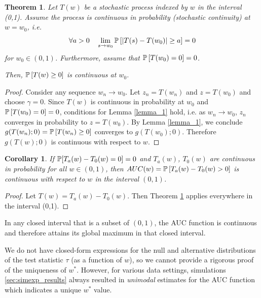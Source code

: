 \documentclass[12pt,oneside,final]{thesis}\usepackage[]{graphicx}\usepackage[]{color}
\newtheorem{thm}{Theorem}
\newtheorem{cor}{Corollary}
\begin{document}
\begin{thm} \label{main_thm}
Let $T(w)$ be  a stochastic process indexed by $w$ in the interval (0,1). Assume  the process is continuous in probability  (stochastic continuity)   at $w=w_0$,  i.e.
\begin{equation} \forall a>0 \quad  \lim_{s \rightarrow w_0} \mathbb{P}\left[\left|T(s)-T(w_0) \right| \geq a \right] = 0 
\end{equation}
for $ w_0\in (0,1)$. Furthermore, assume that $\mathbb{P}\left[T(w_0)=0\right]=0$.

Then, $\mathbb{P} \left[ T(w) \geq 0\right]$ is continuous at $w_0$.
\end{thm}

\begin{proof}
Consider any sequence $w_n \rightarrow w_0$. Let $z_n = T(w_n)$ and  $z=T(w_0)$ and choose $\gamma=0$. Since $T(w)$ is continuous in probability at $w_0$ and $\mathbb{P}\left[T(w_0)=0\right]=0$, conditions for Lemma \ref{lemma_1} hold, i.e. \hspace{-.5em} as $w_n\rightarrow w_0$, $z_n$ converges in probability to $z=T(w_0)$. By  Lemma \ref{lemma_1}, we conclude  $g(T(w_n); 0 ) = \mathbb{P} \left[ T(w_n) \geq 0\right]$ converges to $g(T(w_0);0)$. Therefore $g(T(w);0)$ is continuous with respect to $w$.
\end{proof}


\begin{cor}{
 If $\mathbb{P}[T_a(w)-T_0(w)=0]=0$ and $T_a(w)$, $T_0(w)$ are continuous in probability for all $w \in (0,1)$, then $AUC(w)=\mathbb{P}\left[T_a(w)-T_0(w) >0 \right]$ is continuous with respect to $w$  in the interval $(0,1)$.}
\end{cor}
\begin{proof}

Let $T(w)=T_a(w)-T_0(w).$ Then Theorem \ref{main_thm} applies everywhere in the interval (0,1).
\end{proof}

In any closed interval that is a subset of $(0,1)$, the AUC function is continuous and therefore attains its global maximum in that closed interval.

 We do not have closed-form expressions for the null and alternative distributions of the test statistic $\tau$ (as a function of  $w$), so we cannot provide a rigorous proof of the uniqueness of $w^*$. However, for various data settings, simulations \ref{sec:simexp_results} always resulted in \emph{unimodal}  estimates for the AUC function which indicates a unique $w^*$ value.
\end{document}

